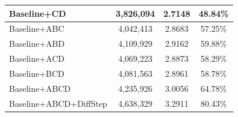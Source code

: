 \documentclass[pdflatex,sn-mathphys-num]{sn-jnl}%
\theoremstyle{thmstyleone}%
\theoremstyle{thmstyletwo}%
\theoremstyle{thmstylethree}%
\begin{document}
\begin{table}[ht]
\begin{tabular}{@{}lccc@{}}
Baseline+CD            & 3,826,094                                                                                                                                                 & 2.7148                                                                                                                                                 & 48.84\% \\ \midrule %
Baseline+ABC           & 4,042,413                                                                                                                                                 & 2.8683                                                                                                                                                 & 57.25\% \\ %
Baseline+ABD           & 4,109,929                                                                                                                                                 & 2.9162                                                                                                                                                 & 59.88\% \\ %
Baseline+ACD           & 4,069,223                                                                                                                                                 & 2.8873                                                                                                                                                 & 58.29\% \\ %
Baseline+BCD           & 4,081,563                                                                                                                                                 & 2.8961                                                                                                                                                 & 58.78\% \\ \midrule %
Baseline+ABCD          & 4,235,926                                                                                                                                                 & 3.0056                                                                                                                                                 & 64.78\% \\ %
Baseline+ABCD+DiffStep & 4,638,329                                                                                                                                                 & 3.2911                                                                                                                                                 & 80.43\% \\ \bottomrule %
\end{tabular}
\end{table}
\end{document}
